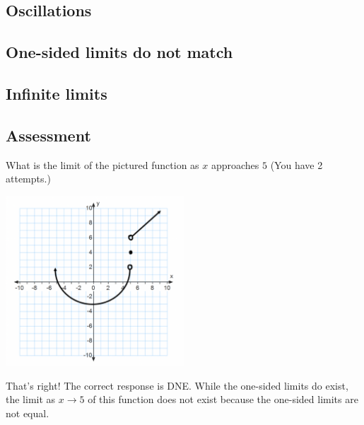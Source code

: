 \documentclass{ximera}
\begin{document}
\subsection{Oscillations}
\begin{center}
\end{center}
\subsection{One-sided limits do not match}
\begin{center}
\end{center}
\subsection{Infinite limits}
\begin{center}
\end{center}
\subsection{Assessment}
\begin{question}
What is the limit of the pictured function as $x$ approaches $5$ (You have 2 attempts.)

\begin{image}
\includegraphics[width=0.5\textwidth]{graph3.png}
\end{image}

\begin{multipleChoice}  
\end{multipleChoice}  

\begin{explanation}
    That's right! The correct response is DNE. While the one-sided limits do exist, the limit as $x \to 5$ of this function does not exist because the one-sided limits are not equal.
\end{explanation}
\end{question}
\end{document}
